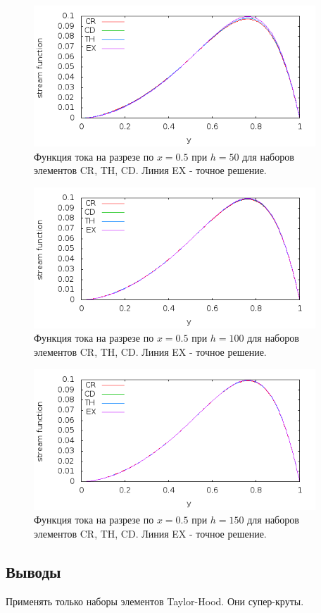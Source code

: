 \documentclass[12pt]{article}
\begin{document}
\begin{figure}
	\begin{center}
		\includegraphics[width=400px]{pics/psi_50}
		\caption{Функция тока на разрезе по $x=0.5$ при $h=50$ для наборов элементов CR, TH, CD. Линия EX - точное решение.}
		\label{fg:psi_50}
	\end{center}
\end{figure}

\begin{figure}
	\begin{center}
		\includegraphics[width=400px]{pics/psi_100}
		\caption{Функция тока на разрезе по $x=0.5$ при $h=100$ для наборов элементов CR, TH, CD. Линия EX - точное решение.}
		\label{fg:psi_100}
	\end{center}
\end{figure}

\begin{figure}
	\begin{center}
		\includegraphics[width=400px]{pics/psi_150}
		\caption{Функция тока на разрезе по $x=0.5$ при $h=150$ для наборов элементов CR, TH, CD. Линия EX - точное решение.}
		\label{fg:psi_150}
	\end{center}
\end{figure}

\newpage
\subsection{Выводы}
Применять только наборы элементов Taylor-Hood. Они супер-круты.
\end{document}
